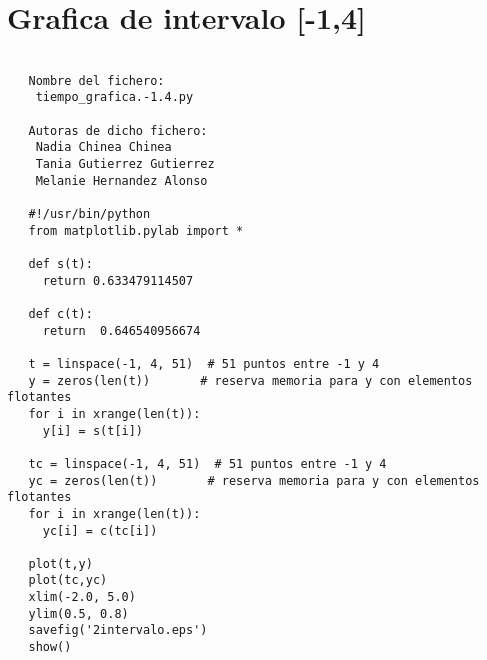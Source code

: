 
\label{Apendice2:label}


\section{Grafica de intervalo [-1,4]}
\label{sec6}
\begin{center}
\begin{footnotesize}
\begin{verbatim}
   
   Nombre del fichero:
    tiempo_grafica.-1.4.py

   Autoras de dicho fichero:
    Nadia Chinea Chinea 
    Tania Gutierrez Gutierrez 
    Melanie Hernandez Alonso

   #!/usr/bin/python
   from matplotlib.pylab import *

   def s(t):
     return 0.633479114507

   def c(t):
     return  0.646540956674

   t = linspace(-1, 4, 51)  # 51 puntos entre -1 y 4
   y = zeros(len(t))       # reserva memoria para y con elementos flotantes
   for i in xrange(len(t)):
     y[i] = s(t[i])

   tc = linspace(-1, 4, 51)  # 51 puntos entre -1 y 4
   yc = zeros(len(t))       # reserva memoria para y con elementos flotantes
   for i in xrange(len(t)):
     yc[i] = c(tc[i])

   plot(t,y)
   plot(tc,yc)
   xlim(-2.0, 5.0)
   ylim(0.5, 0.8)
   savefig('2intervalo.eps')
   show()
   
\end{verbatim}
\end{footnotesize}
\end{center}


